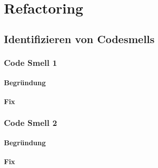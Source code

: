 
\chapter{Refactoring}

\section{Identifizieren von Codesmells}

	\subsection{Code Smell 1}
	
		\subsubsection{Begründung}
		
		\subsubsection{Fix}
		
	\subsection{Code Smell 2}
	
		\subsubsection{Begründung}
		
		\subsubsection{Fix}
